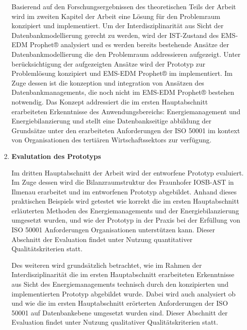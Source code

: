 \begin{enumerate}
    Basierend auf den Forschungsergebnissen des theoretischen Teils der Arbeit wird im zweiten Kapitel der Arbeit eine Lösung für den Problemraum
    konzipiert und implementiert.
    Um der Interdisziplinarität aus Sicht der Datenbankmodellierung gerecht zu werden, wird der IST-Zustand des EMS-EDM Prophet® analysiert und es werden 
    bereits bestehende Ansätze der Datenbankmodellierung die den Problemraum addressieren aufgezeigt.
    Unter berücksichtigung der aufgezeigten Ansätze wird der Prototyp zur Problemlösung konzipiert und EMS-EDM Prophet® im implementiert.
    Im Zuge dessen ist die konzeption und integration von Ansätzen des Datenbankmanagements, die noch nicht im EMS-EDM Prophet® bestehen 
    notwendig.
    Das Konzept addressiert die im ersten Hauptabschnitt erarbeiteten Erkenntnisse des Anwendungsbereichs: Energiemanagement und Energiebilanzierung 
    und stellt eine Datenbankseitige abbildung der Grundsätze unter den erarbeiteten Anforderungen der ISO 50001 im kontext von Organisationen des 
    tertiären Wirtschaftssektors zur verfügung.
    
    \item \textbf{Evalutation des Prototyps}
    
    Im dritten Hauptabschnitt der Arbeit wird der entworfene Prototyp evaluiert.
    Im Zuge dessen wird die Bilanzraumstruktur des Fraunhofer IOSB-AST in Ilmenau erarbeitet und im entworfenen Prototyp abgebildet.
    Anhand dieses praktischen Beispiels wird getestet wie korrekt die im ersten Hauptabschnitt erläuterten Methoden des Energiemanagements und der Energiebilanzierung 
    umgesetzt wurden, und wie der Prototyp in der Praxis bei der Erfüllung von ISO 50001 Anforderungen Organisationen unterstützen kann. 
    Dieser Abschnitt der Evaluation findet unter Nutzung quantitativer Qualitätskriterien statt.

    Des weiteren wird grundsätzlich betrachtet, wie im Rahmen der Interdisziplinarität die im ersten Hauptabschnitt erarbeiteten Erkenntnisse aus Sicht 
    des Energiemanagements technisch durch den konzipierten und implementierten Prototyp abgebildet wurde.
    Dabei wird auch analysiert ob und wie die im ersten Hauptabschnitt erörterten Anforderungen der ISO 50001 auf Datenbankebene umgesetzt wurden sind.
    Dieser Abschnitt der Evaluation findet unter Nutzung qualitativer Qualitätskriterien statt.

\end{enumerate}
